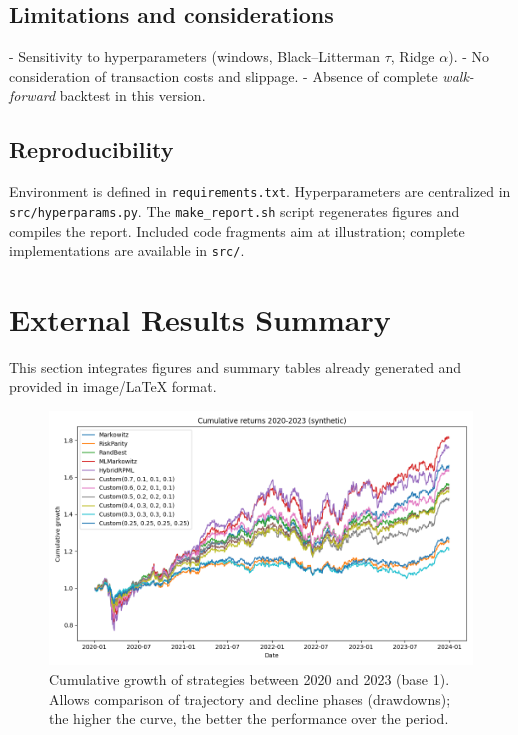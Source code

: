 \documentclass[11pt,a4paper]{article}
\begin{document}
\subsection*{Limitations and considerations}
- Sensitivity to hyperparameters (windows, Black--Litterman \(\tau\), Ridge \(\alpha\)).
- No consideration of transaction costs and slippage.
- Absence of complete \emph{walk-forward} backtest in this version.

\subsection*{Reproducibility}
Environment is defined in \texttt{requirements.txt}. Hyperparameters are centralized in \texttt{src/hyperparams.py}. The \texttt{make\_report.sh} script regenerates figures and compiles the report. Included code fragments aim at illustration; complete implementations are available in \texttt{src/}.

\section*{External Results Summary}
This section integrates figures and summary tables already generated and provided in image/\LaTeX{} format.

\begin{figure}[h]
  \centering
  \includegraphics[width=0.9\linewidth]{../../figures/cumulative_portfolios_generated.png}
  \caption{Cumulative growth of strategies between 2020 and 2023 (base 1). Allows comparison of trajectory and decline phases (drawdowns); the higher the curve, the better the performance over the period.}
  \label{fig:cum_external}
\end{figure}
\end{document}
